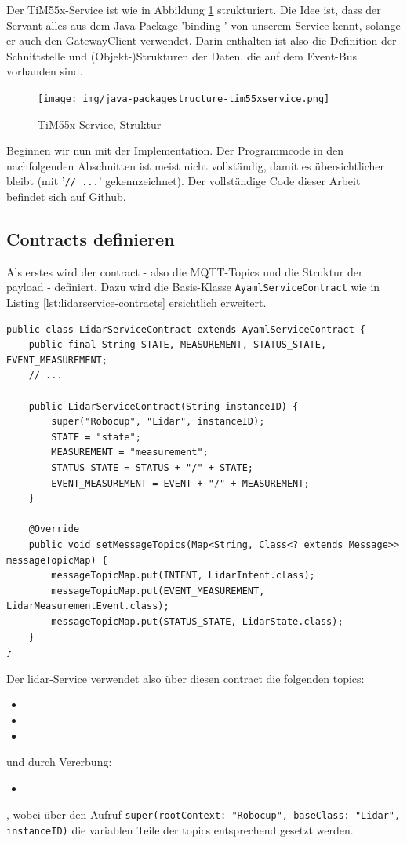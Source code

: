 Der TiM55x-Service ist wie in Abbildung \ref{fig:structure_lidarservice} strukturiert. Die Idee ist, dass der Servant alles aus dem Java-Package 'binding	' von unserem Service kennt, solange er auch den GatewayClient verwendet. Darin enthalten ist also die Definition der Schnittstelle und (Objekt-)Strukturen der Daten, die auf dem Event-Bus vorhanden sind.
\begin{figure}[H]
	\centering
	\texttt{[image: img/java-packagestructure-tim55xservice.png]}
	\caption{TiM55x-Service, Struktur}
	\label{fig:structure_lidarservice}
\end{figure}

Beginnen wir nun mit der Implementation. Der Programmcode in den nachfolgenden Abschnitten ist meist nicht vollständig, damit es übersichtlicher bleibt (mit '\verb|// ...|' gekennzeichnet). Der vollständige Code dieser Arbeit befindet sich auf Github\cite{github-thesis}. \\
\subsection{Contracts definieren}
Als erstes wird der \Gls{contract} - also die MQTT-Topics und die Struktur der \Gls{payload} - definiert. Dazu wird die Basis-Klasse \verb|AyamlServiceContract| wie in Listing \ref{lst:lidarservice-contracts} ersichtlich erweitert.
\begin{lstlisting}[caption={TiM55x-Service - Contracts},label={lst:lidarservice-contracts}]
public class LidarServiceContract extends AyamlServiceContract {
    public final String STATE, MEASUREMENT, STATUS_STATE, EVENT_MEASUREMENT;
    // ...

    public LidarServiceContract(String instanceID) {
        super("Robocup", "Lidar", instanceID);
        STATE = "state";
        MEASUREMENT = "measurement";
        STATUS_STATE = STATUS + "/" + STATE;
        EVENT_MEASUREMENT = EVENT + "/" + MEASUREMENT;
    }

    @Override
    public void setMessageTopics(Map<String, Class<? extends Message>> messageTopicMap) {
        messageTopicMap.put(INTENT, LidarIntent.class);
        messageTopicMap.put(EVENT_MEASUREMENT, LidarMeasurementEvent.class);
        messageTopicMap.put(STATUS_STATE, LidarState.class);
    }
}
\end{lstlisting}
Der \acrshort{lidar}-Service verwendet also über diesen \Gls{contract} die folgenden \Glspl{topic}:
\begin{itemize}
	\item {}
	\item {}
	\item {}
\end{itemize}
und durch Vererbung:
\begin{itemize}
	\item {}
\end{itemize}
, wobei über den Aufruf \verb|super(rootContext: "Robocup", baseClass: "Lidar", instanceID)| die variablen Teile der \Glspl{topic} entsprechend gesetzt werden.

